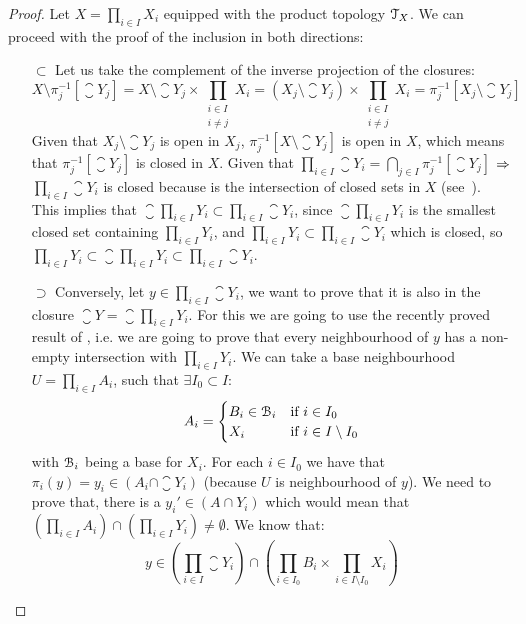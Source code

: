 \begin{proof}Let $X=\prod_{i\in I}X_i$ equipped with the product topology $\EuScript{T}_X$.
We can proceed with the proof of the inclusion in both directions:
\begin{itemize}
\item[$\boxed{\subset}$] Let us take the complement of the inverse projection of the closures:
\[
	X\setminus\pi^{-1}_j[\closure{Y_j}]=X\setminus \closure{Y_j}\times \prod_{\substack{i\in I\\i\neq j}} X_i= (X_j\setminus\closure{Y_j})\times \prod_{\substack{i\in I\\i\neq j}} X_i = \pi^{-1}_j[X_j\setminus\closure{Y_j}]
\]
Given that $X_j\setminus \closure{Y_j}$ is open in $X_j$, $\pi^{-1}_j[X\setminus\closure{Y_j}]$ is open in $X$, which means that $\pi^{-1}_j[\closure{Y_j}]$ is closed in $X$. Given that $\prod_{i\in I}\closure{Y_i}=\bigcap_{j\in I}\pi^{-1}_j[\closure{Y_j}]$ $\Rightarrow$  $\prod_{i\in I}\closure{Y_i}$ is closed because is the intersection of closed sets in $X$ (see~). This implies that
$\closure{\prod_{i\in I}Y_i}\subset\prod_{i\in I}\closure{Y_i}$, since $\closure{\prod_{i\in I}Y_i}$ is the smallest closed set containing $\prod_{i\in I}Y_i$, and $\prod_{i\in I}Y_i\subset\prod_{i\in I}\closure{Y_i}$ which is closed, so $\prod_{i\in I}Y_i\subset \closure{\prod_{i\in I} Y_i}\subset \prod_{i\in I}\closure{Y_i}$.
\item[$\boxed{\supset}$] Conversely, let $y\in \prod_{i\in I}\closure{Y}_i$, we want to prove that it is also in the closure $\closure{Y}=\closure{\prod_{i\in I} Y_i}$.
For this we are going to use the recently proved result of , i.e. we are going to prove that every neighbourhood of $y$ has a non-empty intersection with $\prod_{i\in I}Y_i$. We can take a base neighbourhood $U=\prod_{i\in I} A_i$, such that $\exists  I_0\subset I$:
\[
	A_i = \begin{cases}
		B_i \in \EuScript{B}_{i} & \text{if } i\in I_0\\
		X_i & \text{if } i\in I\setminus I_0
	\end{cases}
\]
with $\EuScript{B}_{i}$ being a base for $X_i$. For each $i\in I_0$ we have that $\pi_{i}(y)=y_i\in (A_i\cap \closure{Y_i})$ (because $U$ is neighbourhood of $y$). We need to prove that, there is a $y_i'\in (A\cap Y_i)$ which would mean that $(\prod_{i\in I}A_{i}) \cap (\prod_{i\in I}Y_i)\neq \emptyset$.
We know that:
\[
  y\in \left(\prod_{i\in I} \closure{Y_i}\right)\cap \left(\prod_{i\in I_0}B_i\times \prod_{i\in I\setminus I_0} X_i\right)
\]
\end{itemize}
\end{proof}
